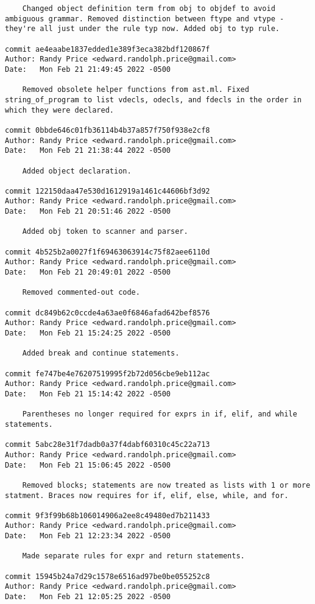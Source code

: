 {\begin{verbatim}
    Changed object definition term from obj to objdef to avoid ambiguous grammar. Removed distinction between ftype and vtype - they're all just under the rule typ now. Added obj to typ rule.

commit ae4eaabe1837edded1e389f3eca382bdf120867f
Author: Randy Price <edward.randolph.price@gmail.com>
Date:   Mon Feb 21 21:49:45 2022 -0500

    Removed obsolete helper functions from ast.ml. Fixed string_of_program to list vdecls, odecls, and fdecls in the order in which they were declared.

commit 0bbde646c01fb36114b4b37a857f750f938e2cf8
Author: Randy Price <edward.randolph.price@gmail.com>
Date:   Mon Feb 21 21:38:44 2022 -0500

    Added object declaration.

commit 122150daa47e530d1612919a1461c44606bf3d92
Author: Randy Price <edward.randolph.price@gmail.com>
Date:   Mon Feb 21 20:51:46 2022 -0500

    Added obj token to scanner and parser.

commit 4b525b2a0027f1f69463063914c75f82aee6110d
Author: Randy Price <edward.randolph.price@gmail.com>
Date:   Mon Feb 21 20:49:01 2022 -0500

    Removed commented-out code.

commit dc849b62c0ccde4a63ae0f6846afad642bef8576
Author: Randy Price <edward.randolph.price@gmail.com>
Date:   Mon Feb 21 15:24:25 2022 -0500

    Added break and continue statements.

commit fe747be4e76207519995f2b72d056cbe9eb112ac
Author: Randy Price <edward.randolph.price@gmail.com>
Date:   Mon Feb 21 15:14:42 2022 -0500

    Parentheses no longer required for exprs in if, elif, and while statements.

commit 5abc28e31f7dadb0a37f4dabf60310c45c22a713
Author: Randy Price <edward.randolph.price@gmail.com>
Date:   Mon Feb 21 15:06:45 2022 -0500

    Removed blocks; statements are now treated as lists with 1 or more statment. Braces now requires for if, elif, else, while, and for.

commit 9f3f99b68b106014906a2ee8c49480ed7b211433
Author: Randy Price <edward.randolph.price@gmail.com>
Date:   Mon Feb 21 12:23:34 2022 -0500

    Made separate rules for expr and return statements.

commit 15945b24a7d29c1578e6516ad97be0be055252c8
Author: Randy Price <edward.randolph.price@gmail.com>
Date:   Mon Feb 21 12:05:25 2022 -0500


\end{verbatim}}
